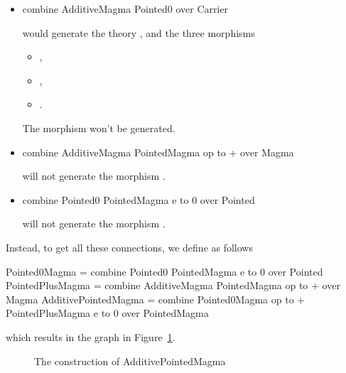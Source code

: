 \begin{itemize}
 \item  
\begin{togcode}
combine AdditiveMagma {} Pointed0 {} over Carrier
\end{togcode}
would generate the theory , and the three morphisms 
\begin{itemize}
    \item {}, 
    \item {}, 
    \item {}. 
\end{itemize}
The morphism  won't be generated. 

\item  
\begin{togcode}
combine AdditiveMagma {} PointedMagma {op to +} over Magma 
\end{togcode}
will not generate the morphism . 

\item 
\begin{togcode}
combine Pointed0 {} PointedMagma {e to 0} over Pointed 
\end{togcode}
will not generate the morphism . 
\end{itemize}
Instead, to get all these connections, we define  as follows 
\begin{togcode}
Pointed0Magma = 
  combine Pointed0 {} PointedMagma {e to 0} over Pointed
PointedPlusMagma = 
  combine AdditiveMagma {} PointedMagma {op to +} over Magma
AdditivePointedMagma = 
  combine Pointed0Magma {op to +} PointedPlusMagma {e to 0} 
  over PointedMagma
\end{togcode}
which results in the graph in Figure~\ref{fig:addPointedMagmaReal}.  
\begin{figure}[h]
    \caption{The construction of AdditivePointedMagma}
    \label{fig:addPointedMagmaReal}
\end{figure}
